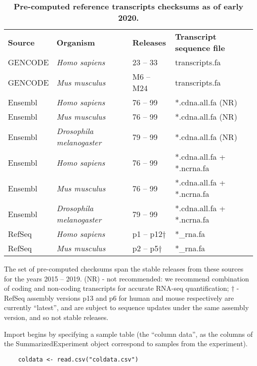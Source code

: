 \documentclass[10pt,letterpaper]{article}
\newlength\savedwidth
\newcommand\thickhline{\noalign{\global\savedwidth\arrayrulewidth\global\arrayrulewidth 2pt}%
\hline
\noalign{\global\arrayrulewidth\savedwidth}}
\begin{document}
\begin{table}[!h]
  \centering
  \caption{\bf{Pre-computed reference transcripts checksums as of early 2020.}}
\begin{tabular}{llll} 
  \hline
  \bf{Source} & \bf{Organism} & \bf{Releases} & \bf{Transcript sequence file} \\
  \thickhline
  GENCODE & \textit{Homo sapiens} & 23 -- 33 & transcripts.fa \\
  GENCODE & \textit{Mus musculus} & M6 -- M24 & transcripts.fa \\
  \hline
  Ensembl & \textit{Homo sapiens} & 76 -- 99 & *.cdna.all.fa (NR) \\
  Ensembl & \textit{Mus musculus} & 76 -- 99 & *.cdna.all.fa (NR) \\
  Ensembl & \textit{Drosophila melanogaster} & 79 -- 99 & *.cdna.all.fa (NR) \\
  \hline
  Ensembl & \textit{Homo sapiens} & 76 -- 99 & *.cdna.all.fa + *.ncrna.fa \\
  Ensembl & \textit{Mus musculus} & 76 -- 99 & *.cdna.all.fa + *.ncrna.fa \\
  Ensembl & \textit{Drosophila melanogaster} & 79 -- 99 & *.cdna.all.fa + *.ncrna.fa \\
  \hline
  RefSeq & \textit{Homo sapiens} & p1 -- p12$\dagger$ & *\_rna.fa \\
  RefSeq & \textit{Mus musculus} & p2 -- p5$\dagger$ & *\_rna.fa \\
\hline
\end{tabular}
\begin{flushleft}
  The set of pre-computed checksums span the stable releases from
  these sources for the years 2015 -- 2019. (NR) - not recommended: we
  recommend combination of coding and non-coding transcripts for
  accurate RNA-seq quantification; $\dagger$ - RefSeq assembly
  versions p13 and p6 for human and mouse respectively are currently
  ``latest'', and are subject to sequence updates under the same
  assembly version, and so not stable releases.
\end{flushleft}
\label{tab:hash}
\end{table}

Import begins by specifying a sample table (the ``column data'', as
the columns of the SummarizedExperiment object correspond to samples
from the experiment).

\begin{verbatim}
    coldata <- read.csv("coldata.csv")
\end{verbatim}
\end{document}
